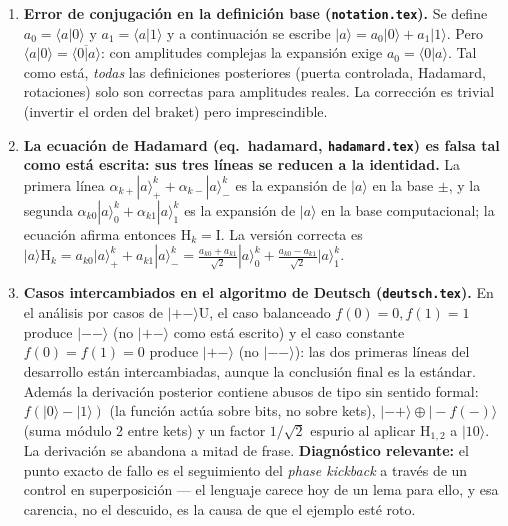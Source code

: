 \documentclass[12pt, a4paper]{article}
\newcommand{\gate}[1]{\text{#1}}
\newcommand{\stateket}[3]{\ket{#1}^{#2}_{#3}}
\newcommand{\ket}[1]{|#1\rangle}
\newcommand{\braket}[2]{\langle #1|#2\rangle}
\begin{document}
\begin{enumerate}
  \item \textbf{Error de conjugación en la definición base
          (\texttt{notation.tex}).} Se define $a_0=\braket{a}{0}$ y
        $a_1=\braket{a}{1}$ y a continuación se escribe
        $\ket{a}=a_0\ket{0}+a_1\ket{1}$. Pero
        $\braket{a}{0}=\overline{\braket{0}{a}}$: con amplitudes complejas la
        expansión exige $a_0=\braket{0}{a}$. Tal como está, \emph{todas} las
        definiciones posteriores (puerta controlada, Hadamard, rotaciones)
        solo son correctas para amplitudes reales. La corrección es trivial
        (invertir el orden del braket) pero imprescindible.

  \item \textbf{La ecuación de Hadamard (eq.~hadamard,
          \texttt{hadamard.tex}) es falsa tal como está escrita: sus tres
          líneas se reducen a la identidad.} La primera línea
        $\alpha_{k+}\stateket{a}{k}{+}+\alpha_{k-}\stateket{a}{k}{-}$ es la
        expansión de $\ket{a}$ en la base $\pm$, y la segunda
        $\alpha_{k0}\stateket{a}{k}{0}+\alpha_{k1}\stateket{a}{k}{1}$ es la
        expansión de $\ket{a}$ en la base computacional; la ecuación afirma
        entonces $\gate{H}_k=\gate{I}$. La versión correcta es
        $\ket{a}\gate{H}_k
          = a_{k0}\stateket{a}{k}{+} + a_{k1}\stateket{a}{k}{-}
          = \tfrac{a_{k0}+a_{k1}}{\sqrt 2}\stateket{a}{k}{0}
          + \tfrac{a_{k0}-a_{k1}}{\sqrt 2}\stateket{a}{k}{1}$.

  \item \textbf{Casos intercambiados en el algoritmo de Deutsch
          (\texttt{deutsch.tex}).} En el análisis por casos de
        $\ket{+-}\gate{U}$, el caso balanceado $f(0)=0,f(1)=1$ produce
        $\ket{--}$ (no $\ket{+-}$ como está escrito) y el caso constante
        $f(0)=f(1)=0$ produce $\ket{+-}$ (no $\ket{--}$): las dos primeras
        líneas del desarrollo están intercambiadas, aunque la conclusión
        final es la estándar. Además la derivación posterior contiene abusos
        de tipo sin sentido formal: $f(\ket{0}-\ket{1})$ (la función actúa
        sobre bits, no sobre kets), $\ket{-+}\oplus\ket{-f(-)}$ (suma módulo
        2 entre kets) y un factor $1/\sqrt{2}$ espurio al aplicar
        $\gate{H}_{1,2}$ a $\ket{10}$. La derivación se abandona a mitad de
        frase. \textbf{Diagnóstico relevante:} el punto exacto de fallo es el
        seguimiento del \emph{phase kickback} a través de un control en
        superposición --- el lenguaje carece hoy de un lema para ello, y esa
        carencia, no el descuido, es la causa de que el ejemplo esté roto.


\end{enumerate}
\end{document}
